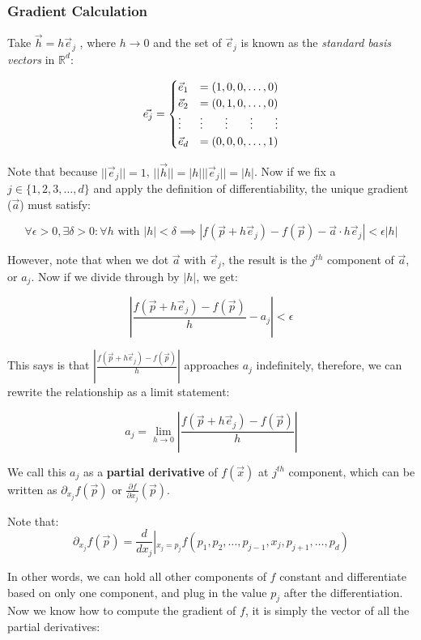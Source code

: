 \documentclass[11 pt, twoside]{article}
\begin{document}
\subsubsection{Gradient Calculation}

Take $\vec{h} = h\vec{e}_j$ , where $h\to 0$ and the set of $\vec{e}_j$ is known
as the \textit{standard basis vectors} in $\mathbb{R}^d$:

\begin{equation*}
\vec{e_j}=
\begin{cases}
\vec{e}_1 &= (1,0,0,\dots,0)\\
\vec{e}_2 &= (0,1,0,\dots,0)\\
\vdots & \vdots \hfill \vdots \hfill \vdots \hfill \vdots\\
\vec{e}_d &= (0,0,0,\dots,1)\\
\end{cases}
\end{equation*}

Note that because $||\vec{e}_j|| = 1$, $||\vec{h}|| = |h|||\vec{e}_j|| = |h|$. Now if we fix a $j \in \{1,2,3,\dots,d\}$ and apply the definition of differentiability, the unique gradient ($\vec{a}$) must satisfy:

$$\forall \epsilon > 0, \exists \delta > 0: \forall h \text{ with } |h| < \delta \implies |f(\vec{p} + h\vec{e}_j) - f(\vec{p}) - \vec{a}\cdot h\vec{e}_j| < \epsilon|h|$$

However, note that when we dot $\vec{a}$ with $\vec{e}_j$, the result is the $j^{th}$ component of $\vec{a}$, or $a_j$. Now if we divide through by $|h|$, we get:

$$\left|\frac{f(\vec{p} + h\vec{e}_j) - f(\vec{p})}{h} - a_j\right| < \epsilon$$

This says is that $\left|\frac{f(\vec{p} + h\vec{e}_j) - f(\vec{p})}{h}\right|$ approaches $a_j$ indefinitely, therefore, we can rewrite the relationship as a limit statement:

$$\boxed{a_j = \lim_{h \to 0} \left|\frac{f(\vec{p} + h\vec{e}_j) - f(\vec{p})}{h}\right|}$$

We call this $a_j$ as a \textbf{partial derivative} of $f(\vec{x})$ at $j^{th}$ component, which can be written as $\partial_{x_j} f(\vec{p})$ or $\frac{\partial f}{\partial x_j} (\vec{p})$.

Note that: $$\partial_{x_j}f(\vec{p}) = \frac{d}{dx_j}\left|_{x_j = p_j} f(p_1, p_2, \dots, p_{j-1}, x_j, p_{j+1}, \dots, p_d)$$

In other words, we can hold all other components of $f$ constant and differentiate based on only one component, and plug in the value $p_j$ after the differentiation. Now we know how to compute the gradient of $f$, it is simply the vector of all the partial derivatives:
\end{document}
